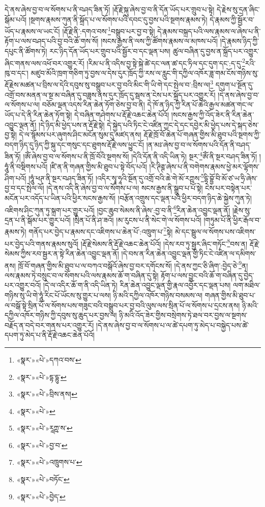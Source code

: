 དེ་ནས་ཞེས་བྱ་བ་ལ་སོགས་པ་ནི་བཤད་ཟིན་ཏོ། །རྡོ་རྗེ་སྐུ་ཞེས་བྱ་བ་ནི་དོན་ཡོད་པར་གྲུབ་པ་སྟེ། དེ་རྗེས་སུ་དྲན་ཞིང་སྒོམ་པའོ། །སྔགས་རྣམས་ཀུན་ནི་སྐྲོད་པ་ལ་སོགས་པའི་དབང་དུ་བྱས་པའི་སྔགས་རྣམས་ཏེ། དེ་རྣམས་ཀྱི་སྦྱོར་བ་ཡོད་པ་རྣམས་ལ་ཡང་ངོ། །རྡོ་རྗེ་ནི་:དགའ་བས་\footnote{«སྣར་»«པེ་»དཀའ་བས་}བསྒྲུབ་པར་བྱ་བ་སྟེ། དེ་རྣམས་བསྐྲད་པའི་ལས་རྣམས་ལ་ཞེས་པ་ནི་རྟོག་པ་ལས་བཤད་པའི་བྱ་བའི་ཆོ་གས་སོ། །སངས་རྒྱས་ནི་ལས་ཀྱི་ཚོགས་རྣམས་ལ་མཁས་པའོ། །དེ་རྣམས་ཉིད་ཀྱི་དཔུང་ནི་ཚོགས་ཏེ། རང་ཉིད་དོན་ཡོད་པར་གྲུབ་པའི་སྦྱོར་བ་དང་ལྡན་པས། ཚུལ་བཞིན་དུ་བྱས་ན་སྐྲོད་པར་འགྱུར་ཞིང་གནས་ལས་འཕོ་བར་འགྱུར་རོ། །རིམ་པ་ནི་འདིས་བྱ་སྟེ་སྐེ་ཚེ་དང་ལན་ཚ་དང་ཏིལ་དང་དུག་དང་:ད་དུ་\footnote{«སྣར་»«པེ་»དྷ་དྷུ་}རའི་ཁུ་བ་དང་། མཛུབ་མོའི་ཁྲག་གཅིག་ཏུ་བྱས་ལ་དེས་དུར་ཁྲོད་ཀྱི་རས་ལ་རླུང་གི་དཀྱིལ་འཁོར་ཟླ་གམ་ངོས་གཉིས་སུ་རྡོ་རྗེས་མཚན་པ་བྲིས་ལ་དེའི་དབུས་སུ་བསྒྲུབ་པར་བྱ་བའི་མིང་གི་ཡི་གེ་དང་སྤེལ་བ་:བྲིས་ལ།\footnote{«སྣར་»«པེ་»བྲིས་ནས།} དགུག་པ་སྔོན་དུ་འགྲོ་བས་མནན་ལ་སྔ་མ་བཞིན་དུ་བཟླས་ནས་དུར་ཁྲོད་དུ་སྦས་ན་ངེས་པར་སྐྲོད་པར་འགྱུར་རོ། །དེ་ནས་ཞེས་བྱ་བ་ལ་སོགས་པ་ལ། བཅོམ་ལྡན་འདས་རིན་ཆེན་ཏོག་ཅེས་བྱ་བ་ནི། དེ་ཁོ་ན་ཉིད་ཀྱི་རིན་པོ་ཆེའི་རྒྱལ་མཚན་གང་ལ་ཡོད་པ་དེ་ནི་རིན་ཆེན་ཏོག་སྟེ། དེ་བཞིན་གཤེགས་པ་རྡོ་རྗེ་འཆང་ཆེན་པོའོ། །སངས་རྒྱས་ཀྱི་འོད་ཟེར་ནི་རིན་ཆེན་འབྱུང་ལྡན་ནོ། །དེ་ཉིད་མི་ཕྱེད་པས་ན་རྡོ་རྗེ་སྟེ། དེ་སྐྱེད་པའི་ཏིང་ངེ་འཛིན་ཀྱང་དེ་དང་དབྱེར་མི་ཕྱེད་པས་དེ་སྐད་ཅེས་བྱ་སྟེ། དེ་ལ་སྙོམས་པར་ཞུགས་ཤིང་མངོན་སུམ་དུ་མཛད་ནས། རྡོ་རྗེ་ཁྲོ་བོ་ཆེན་པོ་གཞན་གྱིས་མི་ཐུབ་པའི་སྔགས་ཀྱི་བདག་ཉིད་དུ་ཉིད་ཀྱི་སྐུ་དང་གསུང་དང་ཐུགས་རྡོ་རྗེ་ལས་ཕྱུང་ངོ། །ན་མཿ་ཞེས་བྱ་བ་ལ་སོགས་པའི་དོན་ནི་བཤད་ཟིན་ཏོ། །ཨོཾ་ཞེས་བྱ་བ་ལ་སོགས་པ་ནི་ཁྲོ་བོའི་སྔགས་སོ། །དེའི་དོན་ནི་འདི་ཡིན་ཏེ། སྔར་\footnote{«སྣར་»«པེ་»}ཨོཾ་ནི་སྔར་བཤད་ཟིན་ཏོ། །ཧཱུཾ་ནི་བསྡིགས་པའོ། །ཛི་ན་ནི་གཞན་གྱིས་མི་ཐུབ་པ་སྟེ་བོད་པའོ། །རི་ཊིཊྚ་ཞེས་པ་ནི་བགེགས་རྣམས་ཕྱེ་མར་ལྷོགས་ཤིག་པའོ། །ཧཱུཾ་ཕཊ་ནི་སྔར་བཤད་ཟིན་ཏོ། །འདིར་སྭཱ་ཧཱའི་སྔོན་དུ་འགྲོ་བའི་ཆེ་གེ་མོ་རཀྵས་\footnote{«སྣར་»«པེ་»རཱཀྵ་ས་}དྷི་བྷྱོ་བི་མོ་ཙ་ཡ་ཧྲི་ཞེས་བྱ་བ་དང་སྤེལ་ལོ། །དེ་ནས་འདི་ནི་ཞེས་བྱ་བ་ལ་སོགས་པ་ལ། སངས་རྒྱས་ནི་སྒྲུབ་པ་པོ་སྟེ། ངེས་པར་བསྟེན་པར་མངོན་པར་འདོད་པ་ཡིན་པའི་ཕྱིར་སངས་རྒྱས་སོ། །བརྩོན་འགྲུས་དང་ལྡན་པའི་ཕྱིར་བདག་ཉིད་ཆེ་སྐྱེས་ཀུན་ཏེ། འཇིགས་ཤིང་ཀུན་ཏུ་སྐྲག་པར་གྱུར་པའོ། །བྱང་ཆུབ་སེམས་ནི་ཞེས་:བྱ་བ་ནི་\footnote{«སྣར་»«པེ་»བྱ་བ་}རིན་ཆེན་འབྱུང་ལྡན་ནོ། །རྗེས་སུ་དྲན་པ་ནི་སྒོམ་པར་གྱུར་པའོ། །སྲིན་པོ་ནི་ཤ་ཟའོ། །མ་རུངས་པ་ནི་སེང་གེ་ལ་སོགས་པའོ། །གཏུམ་པོ་ནི་ཕྱིར་རྒོལ་བ་རྣམས་ཏེ། གནོད་པར་བྱེད་པ་རྣམས་དང་འཇིགས་པ་ཆེན་པོ་:འཁྲུག་པ་\footnote{«སྣར་»«པེ་»འཁྲུགས་པ་}སྟེ། མེ་དང་སྦྲུལ་ལ་སོགས་པས་འཇིགས་པར་བྱེད་པའི་གནས་རྣམས་སུའོ། །རྡོ་རྗེ་སེམས་ནི་རྡོ་རྗེ་འཆང་ཆེན་པོའོ། །དེས་རབ་ཏུ་སྦྱར་ཞིང་གཏོང་\footnote{«སྣར་»«པེ་»བཏོང་}བས་ན། རྡོ་རྗེ་སེམས་ཀྱིས་རབ་སྦྱར་ན་སྟེ་རིན་ཆེན་འབྱུང་ལྡན་ནོ། །དེ་བས་ན་རིན་ཆེན་འབྱུང་ལྡན་གྱི་ཏིང་ངེ་འཛིན་ལ་དམིགས་ནས། ཁྲོ་བོ་གཞན་གྱིས་མི་ཐུབ་པ་ལ་བཀའ་བསྒོའོ་ཞེས་བྱ་བར་དགོངས་སོ། །དེ་ནས་ཀྱང་ཅི་ཞིག་:བྱེད་ཅེ་\footnote{«སྣར་»«པེ་»བྱེད་}ན། ལས་རྣམས་ཏེ་བསྲུང་བ་ལ་སོགས་པའི་ལས་རྣམས་ཆོ་ག་བཞིན་དུ་སྟེ། རྟོག་པ་ལས་བྱུང་བའི་ཆོ་ག་བཞིན་དུ་བྱེད་པར་འགྱུར་བའོ། །དེ་ལ་འདིར་ཆོ་ག་ནི་འདི་ཡིན་ཏེ། རིན་ཆེན་འབྱུང་ལྡན་གྱི་རྣལ་འབྱོར་དང་ལྡན་པས། ལག་མཐིལ་གཉིས་སུ་ཡི་གེ་ཧཱུཾ་རིང་པོ་ཡོངས་སུ་གྱུར་པ་ལས། ཉི་མའི་དཀྱིལ་འཁོར་གཉིས་བསམས་ལ། གཞན་གྱིས་མི་ཐུབ་པ་ལ་བསྒོ་སྟེ་སྲིན་པོ་ལ་སོགས་པས་གཟུང་བའི་བསྒྲུབ་པར་བྱ་བའི་ལུས་ལས་སྲིན་པོ་ལ་སོགས་པ་དྲངས་ནས། ཉི་མའི་དཀྱིལ་འཁོར་གཉིས་ཀྱི་དབུས་སུ་ཆུད་པར་བྱས་ལ། ཉི་མའི་འོད་ཟེར་གྱིས་བསྲེགས་ཏེ་ཐལ་བར་བྱས་ལ་སྔགས་བརྗོད་ན་བདེ་བར་གནས་པར་འགྱུར་རོ། །དེ་ནས་ཞེས་བྱ་བ་ལ་སོགས་པ་ལ་ཚེ་དཔག་ཏུ་མེད་པ་བསྐྱེད་པས་ཚེ་དཔག་ཏུ་མེད་པ་ནི་རྡོ་རྗེ་འཆང་ཆེན་པོའོ། 